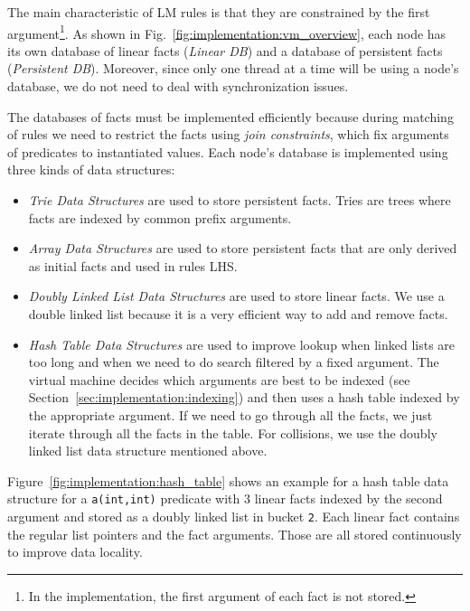 The main characteristic of LM rules is that they are constrained by the first
argument\footnote{In the implementation, the first argument of each fact is not
   stored.}. As shown in Fig.~\ref{fig:implementation:vm_overview}, each node
has its own database of linear facts (\emph{Linear DB}) and a database of
persistent facts (\emph{Persistent DB}).  Moreover, since only one thread at a
time will be using a node's database, we do not need to deal with
synchronization issues.

The databases of facts must be implemented efficiently because during matching
of rules we need to restrict the facts using \emph{join constraints}, which fix
arguments of predicates to instantiated values. Each node's database is
implemented using three kinds of data structures:

\begin{itemize}

\item \emph{Trie Data Structures} are used to store persistent facts. Tries are
   trees where facts are indexed by common prefix arguments.

\item \emph{Array Data Structures} are used to store persistent facts that are
   only derived as initial facts and used in rules LHS.

\item \emph{Doubly Linked List Data Structures} are used to store linear facts.
   We use a double linked list because it is a very efficient way to add and
   remove facts.

\item \emph{Hash Table Data Structures} are used to improve lookup when linked
   lists are too long and when we need to do search filtered by a fixed
   argument. The virtual machine decides which arguments are best to be indexed
   (see Section~\ref{sec:implementation:indexing}) and then uses a hash table
   indexed by the appropriate argument. If we need to go through all the facts,
   we just iterate through all the facts in the table. For collisions, we use
   the doubly linked list data structure mentioned above.

\end{itemize}

Figure~\ref{fig:implementation:hash_table} shows an example for a hash table
data structure for a \texttt{a(int,int)} predicate with 3 linear facts indexed
by the second argument and stored as a doubly linked list in bucket \texttt{2}.
Each linear fact contains the regular list pointers and the fact arguments.
Those are all stored continuously to improve data locality.

